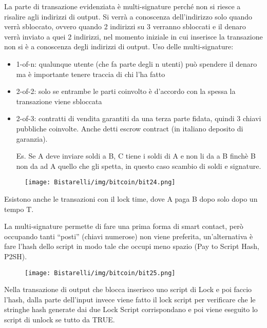 La parte di transazione evidenziata è multi-signature perché non si riesce a risalire agli indirizzi di output. Si verrà
a conoscenza dell’indirizzo solo quando verrà sbloccato, ovvero quando 2 indirizzi su 3 verranno sbloccati e il
denaro verrà inviato a quei 2 indirizzi, nel momento iniziale in cui inserisce la transazione non si è a conoscenza
degli indirizzi di output.
Uso delle multi-signature:
\begin{itemize}
    \item 1-of-n: qualunque utente (che fa parte degli n utenti) può spendere il denaro ma è importante tenere traccia di chi l’ha fatto
    
    \item 2-of-2: solo se entrambe le parti coinvolto è d’accordo con la spessa la transazione viene sbloccata
    
    \item 2-of-3: contratti di vendita garantiti da una terza parte fidata, quindi 3 chiavi pubbliche coinvolte. Anche detti escrow contract (in italiano deposito di garanzia). 
    
    Es. Se A deve inviare soldi a B, C tiene i soldi di A e non li da a B finchè B non da ad A quello che gli spetta, in questo caso scambio di soldi e signature.
\end{itemize}

\begin{figure}[H]
	\centering
    \texttt{[image: Bistarelli/img/bitcoin/bit24.png]}
\end{figure}
Esistono anche le transazioni con il lock time, dove A paga B dopo solo dopo un tempo T. 

\singlespacing

La multi-signature permette di fare una prima forma di smart contact, però occupando tanti “posti” (chiavi
numerose) non viene preferita, un’alternativa è fare l’hash dello script in modo tale che occupi meno spazio (Pay
to Script Hash, P2SH).

\begin{figure}[H]
	\centering
    \texttt{[image: Bistarelli/img/bitcoin/bit25.png]}
\end{figure}

Nella transazione di output che blocca inserisco uno script di Lock e poi faccio l’hash, dalla parte dell’input invece
viene fatto il lock script per verificare che le stringhe hash generate dai due Lock Script corrispondano e poi viene
eseguito lo script di unlock se tutto da TRUE.

